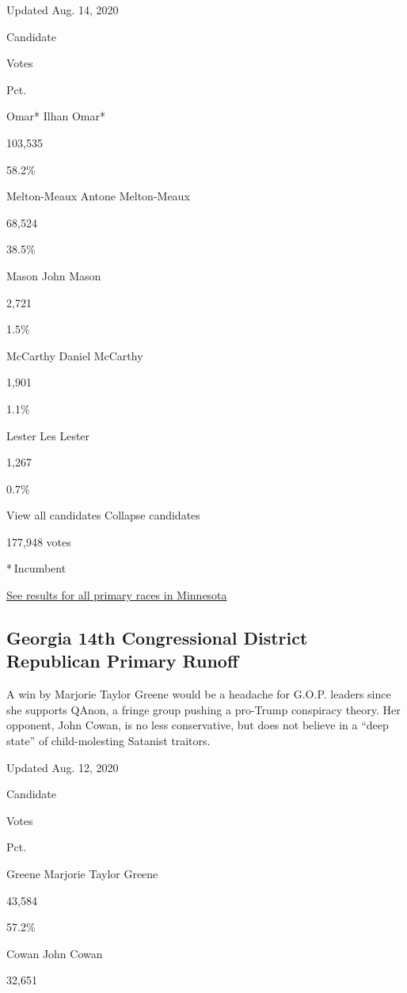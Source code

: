 Updated Aug. 14, 2020

Candidate

Votes

Pct.

 Omar* Ilhan Omar*

103,535

58.2\%

 Melton-Meaux Antone Melton-Meaux

68,524

38.5\%

 Mason John Mason

2,721

1.5\%

 McCarthy Daniel McCarthy

1,901

1.1\%

 Lester Les Lester

1,267

0.7\%

View all candidates Collapse candidates

177,948 votes

* Incumbent

\href{https://www.nytimes3xbfgragh.onion/interactive/2020/08/11/us/elections/results-minnesota-primary-elections.html}{See
results for all primary races in Minnesota}

\hypertarget{georgia-14th-congressional-district-republican-primary-runoff}{%
\subsection{Georgia 14th Congressional District Republican Primary
Runoff}\label{georgia-14th-congressional-district-republican-primary-runoff}}

A win by Marjorie Taylor Greene would be a headache for G.O.P. leaders
since she supports QAnon, a fringe group pushing a pro-Trump conspiracy
theory. Her opponent, John Cowan, is no less conservative, but does not
believe in a ``deep state'' of child-molesting Satanist traitors.

Updated Aug. 12, 2020

Candidate

Votes

Pct.

 Greene Marjorie Taylor Greene

43,584

57.2\%

 Cowan John Cowan

32,651

